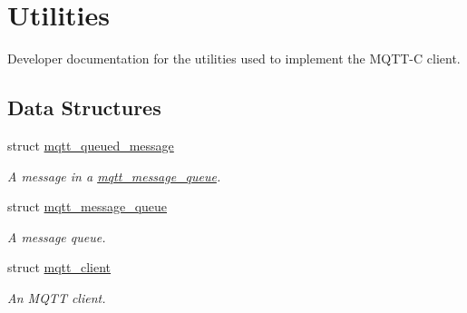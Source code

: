 \hypertarget{group__details}{}\section{Utilities}
\label{group__details}


Developer documentation for the utilities used to implement the M\+Q\+T\+T-\/C client.  


\subsection*{Data Structures}
\begin{DoxyCompactItemize}
\item 
struct \hyperlink{structmqtt__queued__message}{mqtt\+\_\+queued\+\_\+message}
\begin{DoxyCompactList}\small\item\em A message in a \hyperlink{structmqtt__message__queue}{mqtt\+\_\+message\+\_\+queue}. \end{DoxyCompactList}\item 
struct \hyperlink{structmqtt__message__queue}{mqtt\+\_\+message\+\_\+queue}
\begin{DoxyCompactList}\small\item\em A message queue. \end{DoxyCompactList}\item 
struct \hyperlink{structmqtt__client}{mqtt\+\_\+client}
\begin{DoxyCompactList}\small\item\em An M\+Q\+TT client. \end{DoxyCompactList}\end{DoxyCompactItemize}
